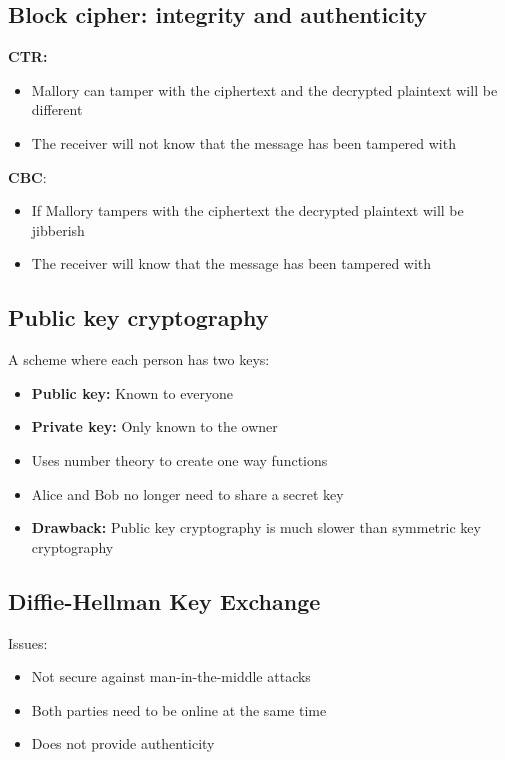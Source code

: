 \documentclass[12pt,a4paper]{article}
\begin{document}
\subsection{Block cipher: integrity and authenticity}
\textbf{CTR:}
\begin{itemize}
    \item Mallory can tamper with the ciphertext and the decrypted plaintext will be different
    \item The receiver will not know that the message has been tampered with
\end{itemize}

\noindent \textbf{CBC}:
\begin{itemize}
    \item If Mallory tampers with the ciphertext the decrypted plaintext will be jibberish
    \item The receiver will know that the message has been tampered with
\end{itemize}

\subsection{Public key cryptography}
A scheme where each person has two keys:
\begin{itemize}
    \item \textbf{Public key:} Known to everyone
    \item \textbf{Private key:} Only known to the owner
    \item Uses number theory to create one way functions 
    \item Alice and Bob no longer need to share a secret key
    \item \textbf{Drawback:} Public key cryptography is much slower than symmetric key cryptography
\end{itemize}

\subsection{Diffie-Hellman Key Exchange}
Issues:
\begin{itemize}
    \item Not secure against man-in-the-middle attacks
    \item Both parties need to be online at the same time
    \item Does not provide authenticity 
\end{itemize}
\end{document}
